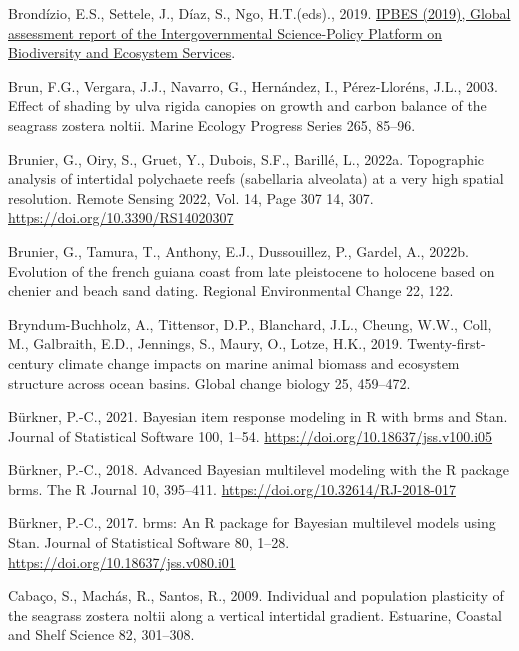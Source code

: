 \documentclass[
  letterpaper,
  11pt,
  english,
  singlespacing,
  headsepline]{MastersDoctoralThesis}
\newlength{\cslhangindent}
\newenvironment{CSLReferences}[2] %
 {\begin{list}{}{%
  \setlength{\itemindent}{0pt}
  \setlength{\leftmargin}{0pt}
  \setlength{\parsep}{0pt}
  \ifodd #1
   \setlength{\leftmargin}{\cslhangindent}
   \setlength{\itemindent}{-1\cslhangindent}
  \fi
  \setlength{\itemsep}{#2\baselineskip}}}
 {\end{list}}
\begin{document}
\begin{CSLReferences}{1}{0}
Brondízio, E.S., Settele, J., Díaz, S., Ngo, H.T.(eds)., 2019.
\href{https://ipbes.net/global-assessment\%0Ahttps://ipbes.net/global-assessment-report-biodiversity-ecosystem-services}{{IPBES
(2019), Global assessment report of the Intergovernmental Science-Policy
Platform on Biodiversity and Ecosystem Services}}.

Brun, F.G., Vergara, J.J., Navarro, G., Hernández, I., Pérez-Lloréns,
J.L., 2003. Effect of shading by ulva rigida canopies on growth and
carbon balance of the seagrass zostera noltii. Marine Ecology Progress
Series 265, 85--96.

Brunier, G., Oiry, S., Gruet, Y., Dubois, S.F., Barillé, L., 2022a.
Topographic analysis of intertidal polychaete reefs (sabellaria
alveolata) at a very high spatial resolution. Remote Sensing 2022, Vol.
14, Page 307 14, 307. \url{https://doi.org/10.3390/RS14020307}

Brunier, G., Tamura, T., Anthony, E.J., Dussouillez, P., Gardel, A.,
2022b. Evolution of the french guiana coast from late pleistocene to
holocene based on chenier and beach sand dating. Regional Environmental
Change 22, 122.

Bryndum-Buchholz, A., Tittensor, D.P., Blanchard, J.L., Cheung, W.W.,
Coll, M., Galbraith, E.D., Jennings, S., Maury, O., Lotze, H.K., 2019.
Twenty-first-century climate change impacts on marine animal biomass and
ecosystem structure across ocean basins. Global change biology 25,
459--472.

Bürkner, P.-C., 2021. Bayesian item response modeling in {R} with {brms}
and {Stan}. Journal of Statistical Software 100, 1--54.
\url{https://doi.org/10.18637/jss.v100.i05}

Bürkner, P.-C., 2018. Advanced {Bayesian} multilevel modeling with the
{R} package {brms}. The R Journal 10, 395--411.
\url{https://doi.org/10.32614/RJ-2018-017}

Bürkner, P.-C., 2017. {brms}: An {R} package for {Bayesian} multilevel
models using {Stan}. Journal of Statistical Software 80, 1--28.
\url{https://doi.org/10.18637/jss.v080.i01}

Cabaço, S., Machás, R., Santos, R., 2009. Individual and population
plasticity of the seagrass zostera noltii along a vertical intertidal
gradient. Estuarine, Coastal and Shelf Science 82, 301--308.


\end{CSLReferences}
\end{document}
